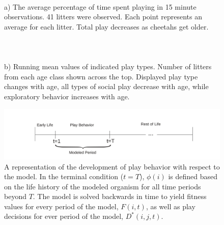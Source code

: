 \documentclass[12pt,letterpaper]{article}
\begin{document}
\begin{figure}[h!]
\begin{center}
\begin{minipage}[t]{0.49\linewidth}
	    \end{minipage}\hfill
	    \begin{minipage}[t]{0.43\linewidth}
	      $~$\\
	      a) The average percentage of time spent playing in 15 minute observations. 41 litters were observed. Each point represents an average for each litter. Total play decreases as cheetahs get older. 
	      \\\\\\\\
	      b) Running mean values of indicated play types. Number of litters from each age class shown across the top. Displayed play type changes with age, all types of social play decrease with age, while exploratory behavior increases with age. 
	    \end{minipage}
	  \end{center}
	\end{figure}

	
	\begin{figure}[h!]
	\caption{A representation of the development of play behavior with respect to the model. In the terminal condition ($t=T$), $\phi(i)$ is defined based on the life history of the modeled organism for all time periods beyond $T$. The model is solved backwards in time to yield fitness values for every period of the model, $F(i,t)$, as well as play decisions for ever period of the model, $D^*(i,j,t)$.}
	\begin{center}
	\includegraphics[width=170mm]{numberLineOfLife.pdf}
	\end{center}
	\label{sdf}
	\end{figure}
    
\end{document}
